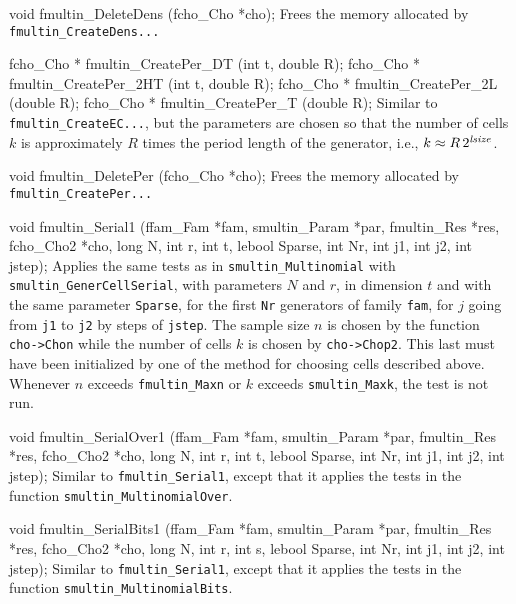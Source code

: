 void fmultin_DeleteDens (fcho_Cho *cho);
\endcode
 \tab 
  Frees the memory allocated by {\tt fmultin\_CreateDens...}
 \endtab
\code


fcho_Cho * fmultin_CreatePer_DT (int t, double R);
fcho_Cho * fmultin_CreatePer_2HT (int t, double R);
fcho_Cho * fmultin_CreatePer_2L (double R);
fcho_Cho * fmultin_CreatePer_T (double R);
\endcode
\tab Similar to {\tt fmultin\_CreateEC...}, but the parameters are chosen
   so that the number of cells $k$ is approximately $R$ times the
   period length of the generator, i.e., $k \approx R\, 2^{\it lsize}$.
\endtab
\code


void fmultin_DeletePer (fcho_Cho *cho);
\endcode
 \tab 
  Frees the memory allocated by {\tt fmultin\_CreatePer...}
 \endtab




\code

void fmultin_Serial1 (ffam_Fam *fam, smultin_Param *par,
                      fmultin_Res *res, fcho_Cho2 *cho,
                      long N, int r, int t, lebool Sparse,
                      int Nr, int j1, int j2, int jstep);
\endcode
\tab
 Applies the same tests as in {\tt smultin\_Multinomial}
 with {\tt smultin\_GenerCellSerial},
 with parameters $N$ and $r$, in 
  dimension $t$ and with the same parameter {\tt Sparse}, for the
  first {\tt Nr} generators of family {\tt fam}, for $j$ going from
  {\tt j1} to {\tt j2} by steps of {\tt jstep}.
 The sample size $n$ is chosen by the function
 {\tt cho->Chon} while the number of cells $k$ is chosen by {\tt cho->Chop2}.
 This last must have been initialized by one of 
 the method for choosing cells described above.
 Whenever $n$ exceeds {\tt fmultin\_Maxn} or $k$ exceeds 
 {\tt smultin\_Maxk}, the test is not run.
\endtab
\code


void fmultin_SerialOver1 (ffam_Fam *fam, smultin_Param *par,
                          fmultin_Res *res, fcho_Cho2 *cho,
                          long N, int r, int t, lebool Sparse,
                          int Nr, int j1, int j2, int jstep);
\endcode
\tab
 Similar to {\tt fmultin\_Serial1}, except that it applies the
  tests in the function {\tt smultin\_Multi\-no\-mialOver}.
\endtab
\code


void fmultin_SerialBits1 (ffam_Fam *fam, smultin_Param *par,
                          fmultin_Res *res, fcho_Cho2 *cho,
                          long N, int r, int s, lebool Sparse,
                          int Nr, int j1, int j2, int jstep);
\endcode
\tab
 Similar to {\tt fmultin\_Serial1}, except that it applies the
 tests in the function {\tt smultin\_Multi\-no\-mialBits}.
\endtab
\code


